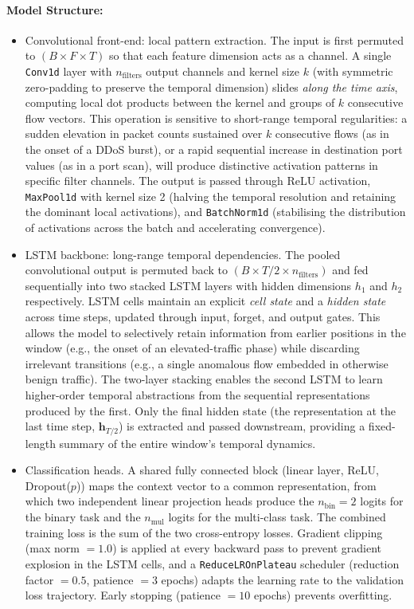 \documentclass[../main.tex]{subfiles}
\begin{document}
\paragraph{Model Structure:}
\begin{itemize}

\item{Convolutional front-end: local pattern extraction.}
The input is first permuted to $(B \times F \times T)$ so that each feature dimension acts as a channel.  A single \texttt{Conv1d} layer with $n_{\text{filters}}$ output channels and kernel size $k$ (with symmetric zero-padding to preserve the temporal dimension) slides \emph{along the time axis}, computing local dot products between the kernel and groups of $k$ consecutive flow vectors.  This operation is sensitive to short-range temporal regularities: a sudden elevation in packet counts sustained over $k$ consecutive flows (as in the onset of a DDoS burst), or a rapid sequential increase in destination port values (as in a port scan), will produce distinctive activation patterns in specific filter channels.  The output is passed through ReLU activation, \texttt{MaxPool1d} with kernel size 2 (halving the temporal resolution and retaining the dominant local activations), and \texttt{BatchNorm1d} (stabilising the distribution of activations across the batch and accelerating convergence).

\item{LSTM backbone: long-range temporal dependencies.}
The pooled convolutional output is permuted back to $(B \times T/2 \times n_{\text{filters}})$ and fed sequentially into two stacked LSTM layers with hidden dimensions $h_1$ and $h_2$ respectively.  LSTM cells maintain an explicit \emph{cell state} and a \emph{hidden state} across time steps, updated through input, forget, and output gates.  This allows the model to selectively retain information from earlier positions in the window (e.g., the onset of an elevated-traffic phase) while discarding irrelevant transitions (e.g., a single anomalous flow embedded in otherwise benign traffic).  The two-layer stacking enables the second LSTM to learn higher-order temporal abstractions from the sequential representations produced by the first.  Only the final hidden state (the representation at the last time step, $\mathbf{h}_{T/2}$) is extracted and passed downstream, providing a fixed-length summary of the entire window's temporal dynamics.

\item{Classification heads.}
A shared fully connected block (linear layer, ReLU, Dropout($p$)) maps the context vector to a common representation, from which two independent linear projection heads produce the $n_{\text{bin}} = 2$ logits for the binary task and the $n_{\text{mul}}$ logits for the multi-class task.  The combined training loss is the sum of the two cross-entropy losses.  Gradient clipping (max norm $= 1.0$) is applied at every backward pass to prevent gradient explosion in the LSTM cells, and a \texttt{ReduceLROnPlateau} scheduler (reduction factor $= 0.5$, patience $= 3$ epochs) adapts the learning rate to the validation loss trajectory.  Early stopping (patience $= 10$ epochs) prevents overfitting.
\end{itemize}
\end{document}

